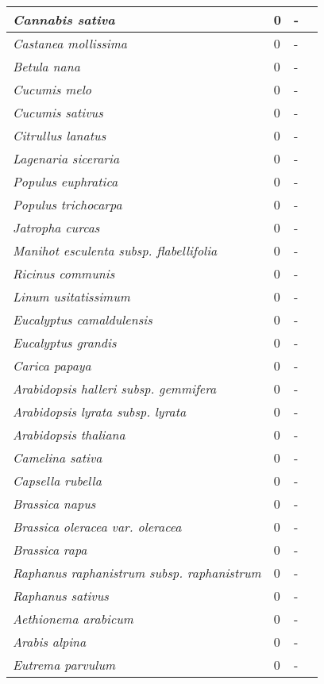 {\begin{longtable}{| L{4cm} | L{2cm}  | L{5cm} | L{4cm} |}
\textit{Cannabis sativa} & 0 & - & \\ \hline
\textit{Castanea mollissima} & 0 & - & \\ \hline
\textit{Betula nana} & 0 & - & \\ \hline
\textit{Cucumis melo} & 0 & - & \\ \hline
\textit{Cucumis sativus} & 0 & - & \\ \hline
\textit{Citrullus lanatus} & 0 & - & \\ \hline
\textit{Lagenaria siceraria} & 0 & - & \\ \hline
\textit{Populus euphratica} & 0 & - & \\ \hline
\textit{Populus trichocarpa} & 0 & - & \\ \hline
\textit{Jatropha curcas} & 0 & - & \\ \hline
\textit{Manihot esculenta subsp. flabellifolia} & 0 & - & \\ \hline
\textit{Ricinus communis} & 0 & - & \\ \hline
\textit{Linum usitatissimum} & 0 & - & \\ \hline
\textit{Eucalyptus camaldulensis} & 0 & - & \\ \hline
\textit{Eucalyptus grandis} & 0 & - & \\ \hline
\textit{Carica papaya} & 0 & - & \\ \hline
\textit{Arabidopsis halleri subsp. gemmifera} & 0 & - & \\ \hline
\textit{Arabidopsis lyrata subsp. lyrata} & 0 & - & \\ \hline
\textit{Arabidopsis thaliana} & 0 & - & \\ \hline
\textit{Camelina sativa} & 0 & - & \\ \hline
\textit{Capsella rubella} & 0 & - & \\ \hline
\textit{Brassica napus} & 0 & - & \\ \hline
\textit{Brassica oleracea var. oleracea} & 0 & - & \\ \hline
\textit{Brassica rapa} & 0 & - & \\ \hline
\textit{Raphanus raphanistrum subsp. raphanistrum} & 0 & - & \\ \hline
\textit{Raphanus sativus} & 0 & - & \\ \hline
\textit{Aethionema arabicum} & 0 & - & \\ \hline
\textit{Arabis alpina} & 0 & - & \\ \hline
\textit{Eutrema parvulum} & 0 & - & \\ \hline

\end{longtable}}

